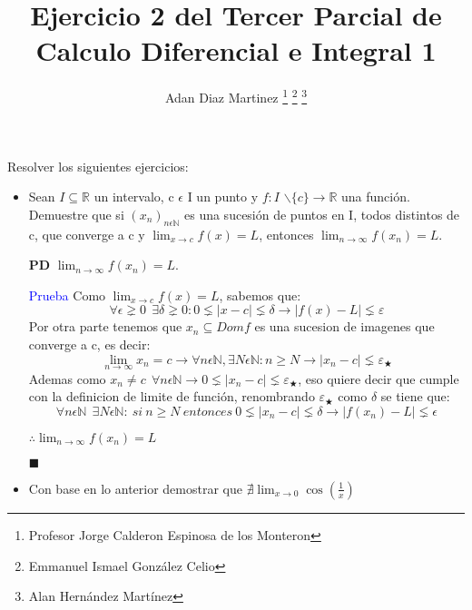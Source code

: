 \documentclass{article}
\title{Ejercicio 2 del Tercer Parcial de Calculo Diferencial e Integral 1}
\author{Adan Diaz Martinez \thanks{Profesor Jorge Calderon Espinosa de los Monteron}
\thanks{Emmanuel Ismael González Celio}
\thanks{Alan Hernández Martínez}}
\theoremstyle{mytheoremstyle}
\theoremstyle{mytheoremstyle}
\theoremstyle{myproblemstyle}
\begin{document}
 
    \maketitle
    \begin{titlepage}
        \maketitle
    \end{titlepage}
 Resolver los siguientes ejercicios:

\medskip
\begin{itemize}
    \item Sean $I \subseteq \mathbb{R}$ un intervalo, c $\epsilon$ I un punto y $f:I$  
    $\backslash \{ c\} \to \mathbb{R} $ una función. 
    Demuestre que si $(x_{n})_{n\epsilon \mathbb{N} }$ es una sucesión de puntos en I, todos distintos de c,
    que converge a c y $\lim_{x\to c} f(x)= \textit{L}$, entonces 
    $\lim_{n\to \infty } f(x_{n})= \textit{L}$.


\medskip
$\mathbf{P} \mathbf{D}$
\medskip
$\lim_{n\to \infty}  f(x_{n})= \textit{L}$.


\medskip
{\textcolor{blue}{Prueba}} 
\medskip
Como $\lim_{x\to c} f(x)= \textit{L}$, sabemos que:
\begin{equation}
\forall \epsilon \gneq 0 \medspace \medspace  \exists\delta \gneq 0 : 0\lneq \left\lvert x-c\right\rvert 
\lneq \delta \rightarrow \left\lvert f(x)-\textit{L}\right\rvert \lneq \varepsilon 
\end{equation}
Por otra parte tenemos que $x_{n}\subseteq Domf$ es una sucesion de imagenes que converge a c, es decir:
\begin{equation}
 \lim_{n \to \infty}x_{n}= c \rightarrow \forall n\epsilon \mathbb{N}, \exists N\epsilon \mathbb{N} 
 : n\geq N \rightarrow \left\lvert x_{n}-c\right\rvert \lneq \varepsilon_\bigstar 
\end{equation}
Ademas como $x_{n}\neq c \medspace \medspace \forall n\epsilon \mathbb{N} \rightarrow 0\lneq 
\left\lvert x_{n}-c\right\rvert \lneq \varepsilon_\bigstar $, eso quiere decir que cumple 
con la definicion de limite de función, renombrando $\varepsilon_\bigstar$ como $\delta$ se tiene que: 
\begin{equation}
 \forall n\epsilon\mathbb{N} \medspace  \medspace \exists N\epsilon \mathbb{N} : \medspace si
 \medspace n\geq N \medspace entonces \medspace 0\lneq \left\lvert x_{n}-c\right\rvert \lneq 
 \delta \rightarrow \left\lvert f(x_{n})-\textit{L}\right\rvert \lneq \epsilon  
\end{equation}
\begin{center} 
$\therefore \lim_{n \to \infty } f(x_{n})= \textit{L}$
    \end{center} 
    \begin{flushright} 
        $\blacksquare$
    \end{flushright}
        \item Con base en lo anterior demostrar que $\nexists \lim_{x \to 0} \cos(\frac{1}{x})$ 


\end{itemize}
\end{document}
